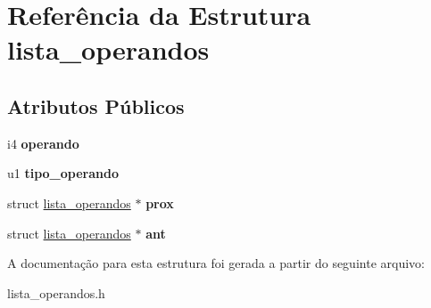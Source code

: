 \hypertarget{structlista__operandos}{}\section{Referência da Estrutura lista\+\_\+operandos}
\label{structlista__operandos}
\subsection*{Atributos Públicos}
\begin{DoxyCompactItemize}
\item 
\mbox{\label{structlista__operandos_ab978dbacb8f42fd87f19cca8e804d121}} 
i4 {\bfseries operando}
\item 
\mbox{\label{structlista__operandos_af64bc84846f21a809f68b783f0e39f40}} 
u1 {\bfseries tipo\+\_\+operando}
\item 
\mbox{\label{structlista__operandos_a90699e5c7f710177b37754cd5231c9f5}} 
struct \hyperlink{structlista__operandos}{lista\+\_\+operandos} $\ast$ {\bfseries prox}
\item 
\mbox{\label{structlista__operandos_abe9d6cbd0d571fc22564a95b17a98123}} 
struct \hyperlink{structlista__operandos}{lista\+\_\+operandos} $\ast$ {\bfseries ant}
\end{DoxyCompactItemize}


A documentação para esta estrutura foi gerada a partir do seguinte arquivo\+:\begin{DoxyCompactItemize}
\item 
lista\+\_\+operandos.\+h\end{DoxyCompactItemize}
